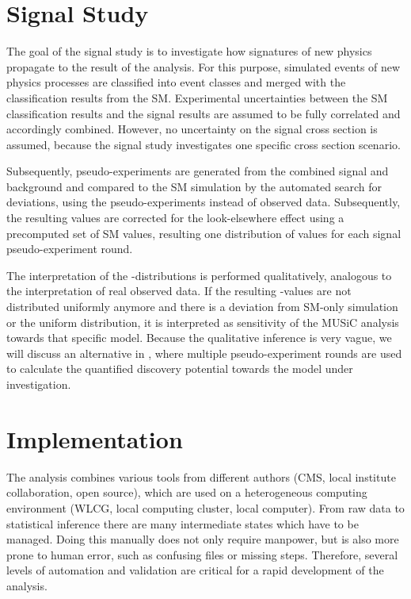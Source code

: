 \section{Signal Study}
\label{sec:signal_study}

The goal of the signal study is to investigate how signatures of new physics propagate to the result of the analysis. For this purpose, simulated events of new physics processes are classified into event classes and merged with the classification results from the \acl{SM}. Experimental uncertainties between the \ac{SM} classification results and the signal results are assumed to be fully correlated and accordingly combined. However, no uncertainty on the signal cross section is assumed, because the signal study investigates one specific cross section scenario.

Subsequently, pseudo-experiments are generated from the combined signal and background and compared to the \ac{SM} simulation by the automated search for deviations, using the pseudo-experiments instead of observed data. Subsequently, the resulting \TSmin values are corrected for the look-elsewhere effect using a precomputed set of \ac{SM} \TS values, resulting one distribution of \ptilde values for each signal pseudo-experiment round.
 
The interpretation of the \ptilde-distributions is performed qualitatively, analogous to the interpretation of real observed data. If the resulting \ptilde-values are not distributed uniformly anymore and there is a deviation from \ac{SM}-only simulation or the uniform distribution, it is interpreted as sensitivity of the \ac{MUSiC} analysis towards that specific model.
Because the qualitative inference is very vague, we will discuss an alternative in , where multiple pseudo-experiment rounds are used to calculate the quantified discovery potential towards the model under investigation.

\section{Implementation}

\newcommand{\Cpp}{{C\raisebox{.3ex}{\scriptsize\textbf{++}}}11\xspace}

The analysis combines various tools from different authors (\ac{CMS}, local institute collaboration, open source), which are used on a heterogeneous computing environment (\ac{WLCG}, local computing cluster, local computer). From raw data to statistical inference there are many intermediate states which have to be managed. Doing this manually does not only require manpower, but is also more prone to human error, such as confusing files or missing steps. Therefore, several levels of automation and validation are critical for a rapid development of the analysis.

